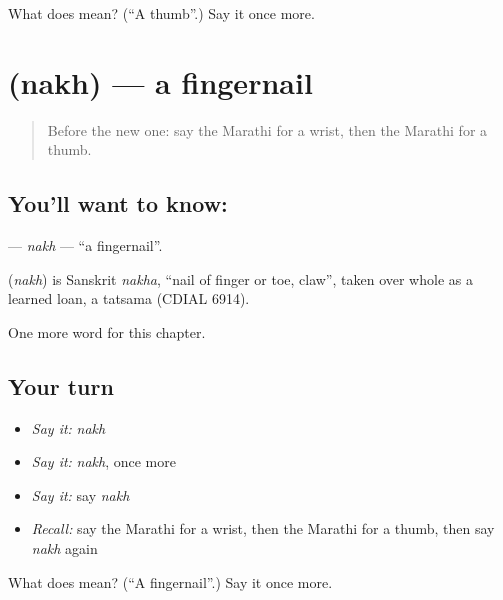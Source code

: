 \begin{tcolorbox}[breakable,colback=teal!4,colframe=teal!35!black,title={Before you move on}]
What does  mean? (\textquotedblleft{}A thumb\textquotedblright{}.) Say it once more.
\end{tcolorbox}
\section[\texorpdfstring{\mr{नख} (nakh)}{नख (nakh)}]{ (nakh) — a fingernail}

\label{lesson:MR-C146-nakh}



\begin{quote}
Before the new one: say the Marathi for a wrist, then the Marathi for a thumb.
\end{quote}

\subsection*{You'll want to know: }
\textbf{} — \emph{nakh} — \textquotedblleft{}a fingernail\textquotedblright{}.

\begin{cousinweb}
\textbf{} (\emph{nakh}) is Sanskrit \emph{nakha}, \textquotedblleft{}nail of finger or toe, claw\textquotedblright{}, taken over whole as a learned loan, a tatsama (CDIAL 6914).
\end{cousinweb}

\begin{grammarlens}[title={What you've built}]
One more word for this chapter.
\end{grammarlens}

\subsection*{Your turn}
\begin{itemize}
\raggedright
  \item \emph{Say it:} \emph{nakh}
  \item \emph{Say it:} \emph{nakh}, once more
  \item \emph{Say it:} say \emph{nakh}
  \item \emph{Recall:} say the Marathi for a wrist, then the Marathi for a thumb, then say \emph{nakh} again
\end{itemize}

\begin{tcolorbox}[breakable,colback=teal!4,colframe=teal!35!black,title={Before you move on}]
What does  mean? (\textquotedblleft{}A fingernail\textquotedblright{}.) Say it once more.
\end{tcolorbox}

